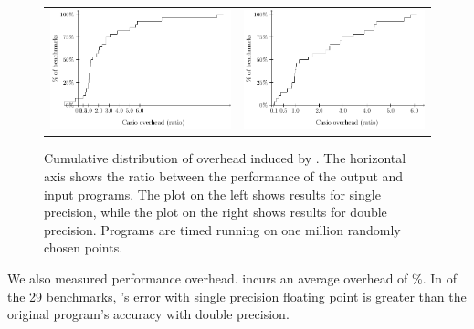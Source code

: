 \documentclass[paper.tex]{subfiles}
\begin{document}
\begin{figure}
  \begin{tabular}{cc}
    \includegraphics[width=0.9\columnwidth]{fig/eval-overhead-f.pdf}
    &
    \includegraphics[width=0.9\columnwidth]{fig/eval-overhead-d.pdf}
  \end{tabular}
  \caption{Cumulative distribution of overhead induced by \casio. The
    horizontal axis shows the ratio between the performance of the
    output and input programs. The plot on the left shows results for
    single precision, while the plot on the right shows results for
    double precision. Programs are timed running on one million
    randomly chosen points.}
  \label{fig:eval-overhead}
\end{figure}

 We also measured performance overhead. \casio incurs
an average overhead of \%.  In  of the 29 benchmarks,
\casio's error with single precision floating point is greater than
the original program's accuracy with double precision.
\end{document}
